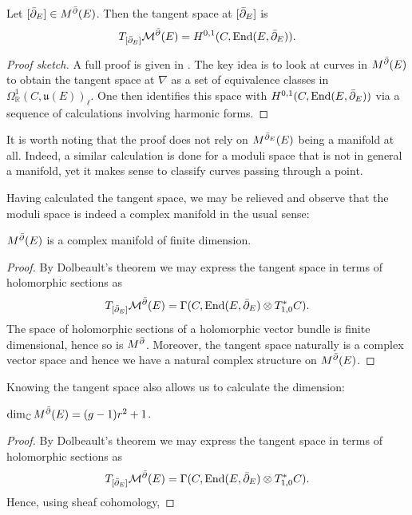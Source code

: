 \documentclass[12pt]{ociamthesis}  %
\begin{document}
\begin{theorem}
  Let $[\bar{\partial}_E]\in M^{\bar{\partial}}(E)$. Then the tangent space at $[\bar{\partial}_E]$ is
  \begin{align*}
    T_{[\bar{\partial}_E]}\mathcal M^{\bar{\partial}}(E) = H^{0,1}(C,\operatorname{End}(E,\bar{\partial}_E)).
  \end{align*}
  \begin{proof}[Proof sketch]
    A full proof is given in \cite[223-225]{kobayashi1987}. The key idea is to look
    at curves in $M^{\bar{\partial}}(E)$ to obtain the tangent space at $\nabla$ as a set of
    equivalence classes in $\Omega^1_{\mathbb{R}}(C,\mathfrak u(E))_\ell$. One then
    identifies this space with $H^{0,1}(C,\operatorname{End}(E,\bar{\partial}_E))$ via a sequence of calculations
    involving harmonic forms.
  \end{proof}
\end{theorem}

It is worth noting that the proof does not rely on $M^{\bar{\partial}_E}(E)$ being a manifold
at all. Indeed, a similar calculation is done for a moduli space that is not
in general a manifold, yet it makes sense to classify curves passing through a point.

Having calculated the tangent space, we may be relieved and observe that the moduli
space is indeed a complex manifold in the usual sense:

\begin{corollary}
  $M^{\bar{\partial}}(E)$ is a complex manifold of finite dimension.
  \begin{proof}
    By Dolbeault's theorem we may express the tangent space in terms of holomorphic
    sections as
    \begin{align*}
      T_{[\bar{\partial}_E]}\mathcal M^{\bar{\partial}}(E) = \Gamma(C,\operatorname{End}(E,\bar{\partial}_E) \otimes T_{1,0}^*C).
    \end{align*}
    The space of holomorphic sections of a holomorphic vector bundle is finite dimensional,
    hence so is $M^{\bar{\partial}}$. Moreover, the tangent space naturally is a complex vector
    space and hence we have a natural complex structure on $M^{\bar{\partial}}(E)$.
  \end{proof}
\end{corollary}

Knowing the tangent space also allows us to calculate the dimension:

\begin{corollary}
  $\dim_{\mathbb{C}} M^{\bar{\partial}}(E) = (g-1)r^2 + 1$.
  \begin{proof}
    By Dolbeault's theorem we may express the tangent space in terms of holomorphic
    sections as
    \begin{align*}
      T_{[\bar{\partial}_E]}\mathcal M^{\bar{\partial}}(E) = \Gamma(C,\operatorname{End}(E,\bar{\partial}_E) \otimes T_{1,0}^*C).
    \end{align*}
    Hence, using sheaf cohomology,
    \missingproof
  \end{proof}
\end{corollary}
\end{document}
